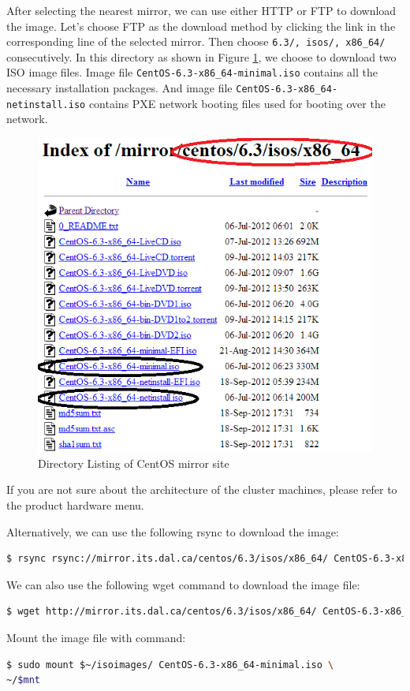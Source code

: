 After selecting the nearest mirror, we can use either HTTP or FTP to download the image. Let's choose FTP as the download method by clicking the link in the corresponding line of the selected mirror. Then choose \verb|6.3/, isos/, x86_64/| consecutively. In this directory as shown in Figure \ref{fig:centos.mirror}, we choose to download two ISO image files. Image file \verb|CentOS-6.3-x86_64-minimal.iso| contains all the necessary installation packages. And image file \verb|CentOS-6.3-x86_64-netinstall.iso| contains PXE network booting files used for booting over the network.
\begin{figure}[ht]
  \centering
  \includegraphics[width=.6\textwidth]{figs/5163os_02_02.png}
  \caption{Directory Listing of CentOS mirror site}\label{fig:centos.mirror}
\end{figure} 
If you are not sure about the architecture of the cluster machines, please refer to the product hardware menu.

Alternatively, we can use the following rsync to download the image:
\lstset{style=bashstyle}
\begin{lstlisting}[language=bash]
$ rsync rsync://mirror.its.dal.ca/centos/6.3/isos/x86_64/ CentOS-6.3-x86_64-netinstall.iso ~/isoimages
\end{lstlisting}

We can also use the following wget command to download the image file: 
\lstset{style=bashstyle}
\begin{lstlisting}[language=bash]
$ wget http://mirror.its.dal.ca/centos/6.3/isos/x86_64/ CentOS-6.3-x86_64-netinstall.iso -P ~/isoimages
\end{lstlisting}

Mount the image file with command:
\lstset{style=bashstyle}
\begin{lstlisting}[language=bash]
$ sudo mount $~/isoimages/ CentOS-6.3-x86_64-minimal.iso \
~/$mnt
\end{lstlisting}


